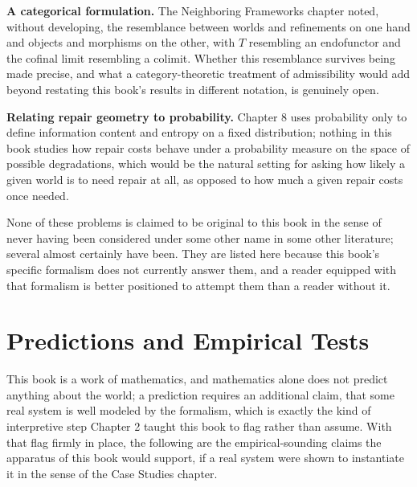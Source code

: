 \documentclass[11pt]{book}
\begin{document}
\textbf{A categorical formulation.} The Neighboring Frameworks chapter noted, without developing, the resemblance between worlds and refinements on one hand and objects and morphisms on the other, with $T$ resembling an endofunctor and the cofinal limit resembling a colimit. Whether this resemblance survives being made precise, and what a category-theoretic treatment of admissibility would add beyond restating this book's results in different notation, is genuinely open.

\textbf{Relating repair geometry to probability.} Chapter 8 uses probability only to define information content and entropy on a fixed distribution; nothing in this book studies how repair costs behave under a probability measure on the space of possible degradations, which would be the natural setting for asking how likely a given world is to need repair at all, as opposed to how much a given repair costs once needed.

None of these problems is claimed to be original to this book in the sense of never having been considered under some other name in some other literature; several almost certainly have been. They are listed here because this book's specific formalism does not currently answer them, and a reader equipped with that formalism is better positioned to attempt them than a reader without it.

\chapter*{Predictions and Empirical Tests}

This book is a work of mathematics, and mathematics alone does not predict anything about the world; a prediction requires an additional claim, that some real system is well modeled by the formalism, which is exactly the kind of interpretive step Chapter 2 taught this book to flag rather than assume. With that flag firmly in place, the following are the empirical-sounding claims the apparatus of this book would support, if a real system were shown to instantiate it in the sense of the Case Studies chapter.
\end{document}
